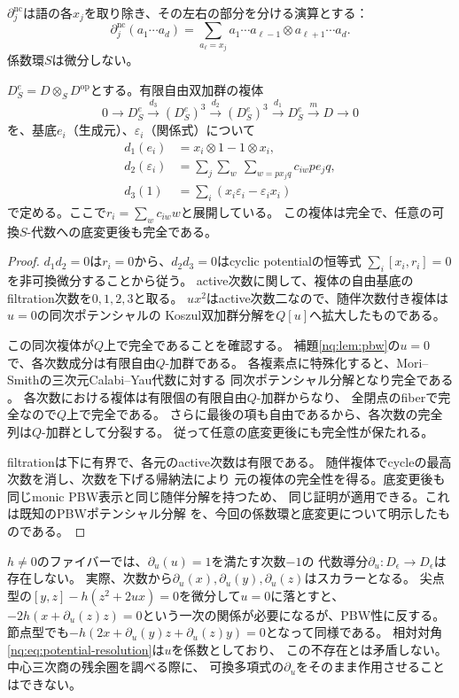 $\partial^{\mathrm{nc}}_j$は語の各$x_j$を取り除き、その左右の部分を分ける演算とする：
\[
 \partial^{\mathrm{nc}}_j(a_1\cdots a_d)
 =\sum_{a_\ell=x_j} a_1\cdots a_{\ell-1}\otimes a_{\ell+1}\cdots a_d.
\]
係数環$S$は微分しない。
\begin{proposition}[底変更と両立する第一ブロックの相対対角]
\label{nq:prop:relative-diagonal}
$D^e_S=D\otimes_S D^{\mathrm{op}}$とする。有限自由双加群の複体
\[
 0\longrightarrow D^e_S
 \xrightarrow{d_3}(D^e_S)^3
 \xrightarrow{d_2}(D^e_S)^3
 \xrightarrow{d_1}D^e_S
 \xrightarrow{m}D\longrightarrow0
 \tag{K}\label{nq:eq:potential-resolution}
\]
を、基底$e_i$（生成元）、$\varepsilon_i$（関係式）について
\begin{align*}
 d_1(e_i)&=x_i\otimes1-1\otimes x_i,\\
 d_2(\varepsilon_i)&=\sum_j\sum_w\ \sum_{w=p x_j q} c_{iw}p e_j q,\\
 d_3(1)&=\sum_i(x_i\varepsilon_i-\varepsilon_i x_i)
\end{align*}
で定める。ここで$r_i=\sum_w c_{iw}w$と展開している。
この複体は完全で、任意の可換$S$-代数への底変更後も完全である。
\end{proposition}
\begin{proof}
$d_1d_2=0$は$r_i=0$から、$d_2d_3=0$はcyclic potentialの恒等式
$\sum_i[x_i,r_i]=0$を非可換微分することから従う。
active次数に関して、複体の自由基底のfiltration次数を$0,1,2,3$と取る。
$ux^2$はactive次数二なので、随伴次数付き複体は$u=0$の同次ポテンシャルの
Koszul双加群分解を$Q[u]$へ拡大したものである。

この同次複体が$Q$上で完全であることを確認する。
補題\ref{nq:lem:pbw}の$u=0$で、各次数成分は有限自由$Q$-加群である。
各複素点に特殊化すると、Mori--Smithの三次元Calabi--Yau代数に対する
同次ポテンシャル分解となり完全である
\cite[Theorem 4.2]{MSNE12}\cite[\S3.2]{BTNE12}。
各次数における複体は有限個の有限自由$Q$-加群からなり、
全閉点のfiberで完全なので$Q$上で完全である。
さらに最後の項も自由であるから、各次数の完全列は$Q$-加群として分裂する。
従って任意の底変更後にも完全性が保たれる。

filtrationは下に有界で、各元のactive次数は有限である。
随伴複体でcycleの最高次数を消し、次数を下げる帰納法により
元の複体の完全性を得る。底変更後も同じmonic PBW表示と同じ随伴分解を持つため、
同じ証明が適用できる。これは既知のPBWポテンシャル分解
\cite[Theorem 3.6の証明]{BTNE12}を、今回の係数環と底変更について明示したものである。
\end{proof}

\begin{remark}[中心方向の通常微分は使えない]\label{nq:rem:no-derivation}
$h\ne0$のファイバーでは、$\partial_u(u)=1$を満たす次数$-1$の
代数導分$\partial_u:D_\epsilon\to D_\epsilon$は存在しない。
実際、次数から$\partial_u(x),\partial_u(y),\partial_u(z)$はスカラーとなる。
尖点型の$[y,z]-h(z^2+2ux)=0$を微分して$u=0$に落とすと、
$-2h(x+\partial_u(z)z)=0$という一次の関係が必要になるが、PBW性に反する。
節点型でも$-h(2x+\partial_u(y)z+\partial_u(z)y)=0$となって同様である。
相対対角\eqref{nq:eq:potential-resolution}は$u$を係数としており、
この不存在とは矛盾しない。中心三次商の残余圏を調べる際に、
可換多項式の$\partial_u$をそのまま作用させることはできない。
\end{remark}

